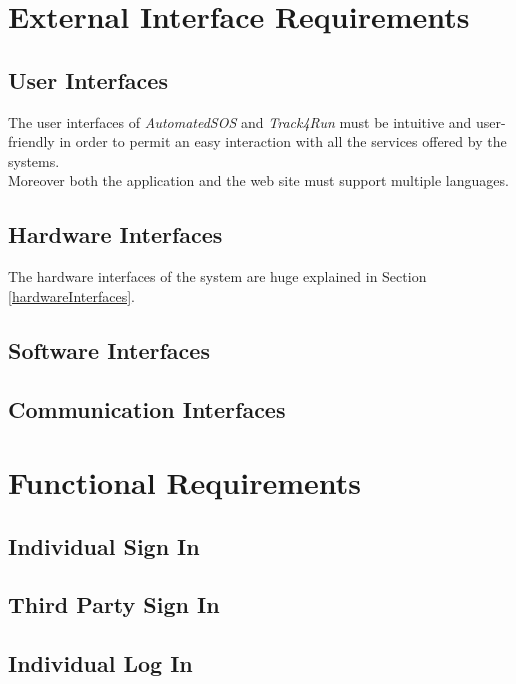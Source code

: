 \section{External Interface Requirements}

\subsection{User Interfaces}
The user interfaces of \textit{AutomatedSOS} and \textit{Track4Run} must be intuitive and user-friendly in order to permit an easy interaction with all the services offered by the systems.\\
Moreover both the application and the web site must support multiple languages.

\subsection{Hardware Interfaces}
The hardware interfaces of the system are huge explained in Section \ref{hardwareInterfaces}.

\subsection{Software Interfaces}

\subsection{Communication Interfaces}

\clearpage
\section{Functional Requirements}

\subsection{Individual Sign In}\label{individualLogIn}

\clearpage

\subsection{Third Party Sign In}

\clearpage

\subsection{Individual Log In}

\clearpage

